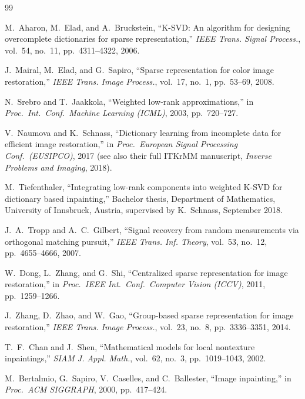 \documentclass[11pt,a4paper]{article}
\theoremstyle{definition}
\theoremstyle{remark}
\begin{document}
\begin{thebibliography}{99}

M.~Aharon, M.~Elad, and A.~Bruckstein,
``K-SVD: An algorithm for designing overcomplete dictionaries for sparse
representation,''
\emph{IEEE Trans. Signal Process.}, vol.~54, no.~11, pp.~4311--4322, 2006.

J.~Mairal, M.~Elad, and G.~Sapiro,
``Sparse representation for color image restoration,''
\emph{IEEE Trans. Image Process.}, vol.~17, no.~1, pp.~53--69, 2008.

N.~Srebro and T.~Jaakkola,
``Weighted low-rank approximations,''
in \emph{Proc.\ Int.\ Conf.\ Machine Learning (ICML)}, 2003,
pp.~720--727.

V.~Naumova and K.~Schnass,
``Dictionary learning from incomplete data for efficient image
restoration,''
in \emph{Proc.\ European Signal Processing Conf.\ (EUSIPCO)}, 2017
(see also their full ITKrMM manuscript, \emph{Inverse Problems and
Imaging}, 2018).

M.~Tiefenthaler,
``Integrating low-rank components into weighted K-SVD for dictionary
based inpainting,''
Bachelor thesis, Department of Mathematics, University of Innsbruck,
Austria, supervised by K.~Schnass, September 2018.

J.~A.~Tropp and A.~C.~Gilbert,
``Signal recovery from random measurements via orthogonal matching
pursuit,''
\emph{IEEE Trans. Inf. Theory}, vol.~53, no.~12, pp.~4655--4666, 2007.

W.~Dong, L.~Zhang, and G.~Shi,
``Centralized sparse representation for image restoration,''
in \emph{Proc.\ IEEE Int.\ Conf.\ Computer Vision (ICCV)}, 2011,
pp.~1259--1266.

J.~Zhang, D.~Zhao, and W.~Gao,
``Group-based sparse representation for image restoration,''
\emph{IEEE Trans. Image Process.}, vol.~23, no.~8, pp.~3336--3351,
2014.

T.~F.~Chan and J.~Shen,
``Mathematical models for local nontexture inpaintings,''
\emph{SIAM J. Appl. Math.}, vol.~62, no.~3, pp.~1019--1043, 2002.

M.~Bertalmio, G.~Sapiro, V.~Caselles, and C.~Ballester,
``Image inpainting,''
in \emph{Proc.\ ACM SIGGRAPH}, 2000, pp.~417--424.


\end{thebibliography}
\end{document}

